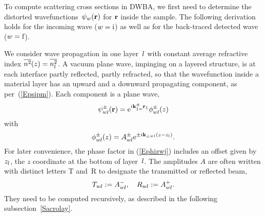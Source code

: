%

To compute scattering cross sections in DWBA,
we first need to determine the distorted wavefunctions~$\psi_w(\mathbf{r})$
for $\mathbf{r}$ inside the sample.
The following derivation holds for the incoming wave ($w=\text{i}$)
as well as for the back-traced detected wave ($w=\text{f}$).

We consider wave propagation in one layer~$l$
%
with constant average refractive index $\overline{n^2}(z)=\overline{n_l^2}$.
A vacuum plane wave, impinging on a layered structure,
is at each interface partly reflected, partly refracted,
so that the wavefunction inside a material layer
has an upward and a downward propagating component,
as per~(\ref{Epsipm}).
Each component is a plane wave,
\begin{equation}
  \psi^\pm_{wl}(\mathbf{r})=\text{e}^{i\mathbf{k}^\pm_{\parallel w}\mathbf{r}_\parallel}\phi^\pm_{wl}(z)
\end{equation}
with
\begin{equation}\label{Ephizwj}
  \phi^\pm_{wl}(z)=A^\pm_{wl}\text{e}^{\pm i\mathbf{k}_{\perp wl}(z-z_l)}.
\end{equation}
%
For later convenience,
the phase factor in (\ref{Ephizwj}) includes an offset
given by~$z_l$, the $z$ coordinate at the bottom of layer~$l$.
The amplitudes $A$ are often written with distinct letters
T and~R to designate the transmitted or reflected beam,
\begin{equation}
  T_{wl} := A^-_{wl},\quad
  R_{wl} := A^+_{wl}.
\end{equation}
%
%
They need to be computed recursively,
as described in the following subsection~\ref{Sacrolay}.

